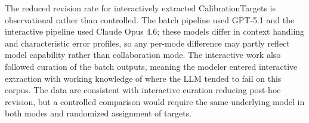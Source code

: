 The reduced revision rate for interactively extracted CalibrationTargets is observational rather than controlled. The batch pipeline used GPT-5.1 and the interactive pipeline used Claude Opus 4.6; these models differ in context handling and characteristic error profiles, so any per-mode difference may partly reflect model capability rather than collaboration mode. The interactive work also followed curation of the batch outputs, meaning the modeler entered interactive extraction with working knowledge of where the LLM tended to fail on this corpus. The data are consistent with interactive curation reducing post-hoc revision, but a controlled comparison would require the same underlying model in both modes and randomized assignment of targets.
